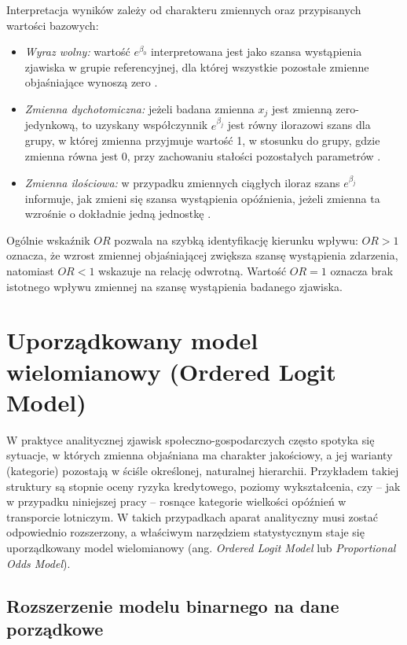 Interpretacja wyników zależy od charakteru zmiennych oraz przypisanych wartości bazowych:
\begin{itemize}
    \item \textit{Wyraz wolny:} wartość $e^{\beta_0}$ interpretowana jest jako szansa wystąpienia zjawiska w grupie referencyjnej, dla której wszystkie pozostałe zmienne objaśniające wynoszą zero \cite{jackowska2011}.
    \item \textit{Zmienna dychotomiczna:} jeżeli badana zmienna $x_j$ jest zmienną zero-jedynkową, to uzyskany współczynnik $e^{\beta_j}$ jest równy ilorazowi szans dla grupy, w której zmienna przyjmuje wartość 1, w stosunku do grupy, gdzie zmienna równa jest 0, przy zachowaniu stałości pozostałych parametrów \cite{jackowska2011}.
    \item \textit{Zmienna ilościowa:} w przypadku zmiennych ciągłych iloraz szans $e^{\beta_j}$ informuje, jak zmieni się szansa wystąpienia opóźnienia, jeżeli zmienna ta wzrośnie o dokładnie jedną jednostkę \cite{jackowska2011}.
\end{itemize}

Ogólnie wskaźnik $OR$ pozwala na szybką identyfikację kierunku wpływu: $OR > 1$ oznacza, że wzrost zmiennej objaśniającej zwiększa szansę wystąpienia zdarzenia, natomiast $OR < 1$ wskazuje na relację odwrotną. Wartość $OR = 1$ oznacza brak istotnego wpływu zmiennej na szansę wystąpienia badanego zjawiska.

\section{Uporządkowany model wielomianowy (Ordered Logit Model)}

W praktyce analitycznej zjawisk społeczno-gospodarczych często spotyka się sytuacje, w których zmienna objaśniana ma charakter jakościowy, a jej warianty (kategorie) pozostają w ściśle określonej, naturalnej hierarchii. Przykładem takiej struktury są stopnie oceny ryzyka kredytowego, poziomy wykształcenia, czy – jak w przypadku niniejszej pracy – rosnące kategorie wielkości opóźnień w transporcie lotniczym. W takich przypadkach aparat analityczny musi zostać odpowiednio rozszerzony, a właściwym narzędziem statystycznym staje się uporządkowany model wielomianowy (ang. \textit{Ordered Logit Model} lub \textit{Proportional Odds Model}).

\subsection{Rozszerzenie modelu binarnego na dane porządkowe}

